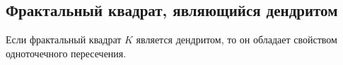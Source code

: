 %
%
%






\subsection{Фрактальный квадрат, являющийся дендритом}

\begin{proposition}
\label{thm:den_necessary_sufficient}
Если фрактальный квадрат $K$ является дендритом, то он обладает свойством одноточечного пересечения.
\end{proposition}

